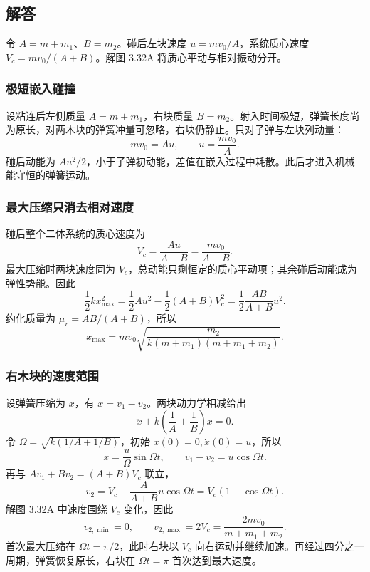 \documentclass[UTF8,fontset=fandol,a4paper,11pt]{ctexart}
\newcommand{\figcaption}[1]{\par\vspace{2pt}{\small\color{muted}#1}\par}
\begin{document}
\subsection*{解答}

令 $A=m+m_1$、$B=m_2$。碰后左块速度 $u=mv_0/A$，系统质心速度 $V_c=mv_0/(A+B)$。解图 3.32A 将质心平动与相对振动分开。
\begin{center}\begin{minipage}{\linewidth}\centering{}
\figcaption{解图 3.32A\quad 右块速度在 $0$ 与 $2V_c$ 之间振动。}
\end{minipage}\end{center}

\subsubsection*{极短嵌入碰撞}
设粘连后左侧质量 $A=m+m_1$，右块质量 $B=m_2$。射入时间极短，弹簧长度尚为原长，对两木块的弹簧冲量可忽略，右块仍静止。只对子弹与左块列动量：
\[
mv_0=A u,\qquad u=\frac{mv_0}{A}.
\]
碰后动能为 $Au^2/2$，小于子弹初动能，差值在嵌入过程中耗散。此后才进入机械能守恒的弹簧运动。

\subsubsection*{最大压缩只消去相对速度}
碰后整个二体系统的质心速度为
\[
V_c=\frac{Au}{A+B}=\frac{mv_0}{A+B}.
\]
最大压缩时两块速度同为 $V_c$，总动能只剩恒定的质心平动项；其余碰后动能成为弹性势能。因此
\[
\frac12kx_{\max}^2
=\frac12Au^2-\frac12(A+B)V_c^2
=\frac12\frac{AB}{A+B}u^2.
\]
约化质量为 $\mu_r=AB/(A+B)$，所以
\[
\boxed{x_{\max}=mv_0
\sqrt{\frac{m_2}{k(m+m_1)(m+m_1+m_2)}}}.
\]

\subsubsection*{右木块的速度范围}
设弹簧压缩为 $x$，有 $\dot x=v_1-v_2$。两块动力学相减给出
\[
\ddot x+k\left(\frac1A+\frac1B\right)x=0.
\]
令 $\Omega=\sqrt{k(1/A+1/B)}$，初始 $x(0)=0,\dot x(0)=u$，所以
\[
x=\frac u\Omega\sin\Omega t,\qquad
v_1-v_2=u\cos\Omega t.
\]
再与 $Av_1+Bv_2=(A+B)V_c$ 联立，
\[
v_2=V_c-\frac{A}{A+B}u\cos\Omega t
=V_c(1-\cos\Omega t).
\]
解图 3.32A 中速度围绕 $V_c$ 变化，因此
\[
\boxed{v_{2,\min}=0,\qquad
v_{2,\max}=2V_c=\frac{2mv_0}{m+m_1+m_2}}.
\]
首次最大压缩在 $\Omega t=\pi/2$，此时右块以 $V_c$ 向右运动并继续加速。再经过四分之一周期，弹簧恢复原长，右块在 $\Omega t=\pi$ 首次达到最大速度。
\end{document}
